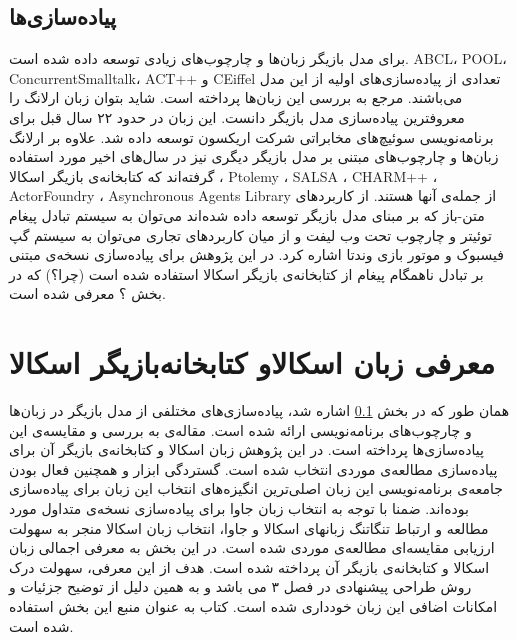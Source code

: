 \subsection{پیاده‌سازی‌ها}
\label{subsectio:actorImpls}
برای مدل بازیگر زبان‌ها و چارچوب‌های زیادی توسعه داده شده است. ABCL، POOL، ConcurrentSmalltalk، ACT++ و CEiffel تعدادی از پیاده‌سازی‌های اولیه از این مدل می‌باشند. مرجع \cite{Briot98concurrencyand} به بررسی این زبان‌ها پرداخته است. شاید بتوان زبان  \gls{ارلانگ}\cite{erlang} را معروفترین پیاده‌سازی مدل بازیگر دانست. این زبان در حدود ۲۲ سال قبل برای برنامه‌نویسی سوئیچ‌های مخابراتی شرکت اریکسون توسعه داده شد. علاوه بر ارلانگ زبان‌ها و چارچوب‌های مبتنی بر مدل بازیگر دیگری نیز در سال‌های اخیر مورد استفاده گرفته‌اند که کتابخانه‌ی بازیگر اسکالا
 \cite{ScalaActors}،  Ptolemy \cite{Ptolemy}، SALSA \cite{salsa}، CHARM++ \cite{CHARMplus}، ActorFoundry \cite{ActorFoundry}، Asynchronous Agents Library \cite{AsyncAgentsLib}  از جمله‌ی آنها هستند.
  از کاربردهای متن-باز که بر مبنای مدل بازیگر توسعه داده شده‌اند می‌توان به سیستم تبادل پیغام توئیتر و چارچوب تحت وب لیفت و از میان کاربرد‌های تجاری می‌توان به سیستم گپ فیسبوک و موتور بازی وندتا اشاره کرد.
در این پژوهش برای پیاده‌سازی نسخه‌ی مبتنی بر تبادل ناهمگام پیغام از کتابخانه‌ی بازیگر اسکالا استفاده شده است (چرا؟) که در بخش ؟ معرفی شده است.


\section{معرفی زبان اسکالاو  کتابخانه‌بازیگر اسکالا}
\label{section:Scala}
همان طور که در بخش \ref{subsectio:actorImpls} اشاره شد، پیاده‌سازی‌های مختلفی از مدل بازیگر در زبان‌ها و چارچوب‌های برنامه‌نویسی ارائه شده است. مقاله‌ی \cite{ActorsJVM2009} به بررسی و مقایسه‌ی این پیاده‌سازی‌ها پرداخته است. در این پژوهش زبان اسکالا و کتابخانه‌ی بازیگر آن برای پیاده‌سازی مطالعه‌ی موردی انتخاب شده است. گستردگی ابزار و همچنین فعال بودن جامعه‌ی برنامه‌نویسی این زبان اصلی‌ترین انگیزه‌های انتخاب این زبان برای پیاده‌سازی بوده‌اند. ضمنا با توجه به انتخاب زبان جاوا برای پیاده‌سازی نسخه‌ی متداول مورد مطالعه و ارتباط تنگاتنگ زبانهای اسکالا و جاوا، انتخاب زبان اسکالا منجر به سهولت ارزیابی مقایسه‌ای مطالعه‌ی موردی شده است. در این بخش به معرفی اجمالی زبان اسکالا و کتابخانه‌ی بازیگر آن پرداخته شده است. هدف از این معرفی، سهولت درک روش طراحی پیشنهادی در فصل ۳ می باشد و به همین دلیل از توضیح جزئیات و امکانات اضافی این زبان خودداری شده است. کتاب \cite{programmingInScala} به عنوان منبع این بخش استفاده شده است.
